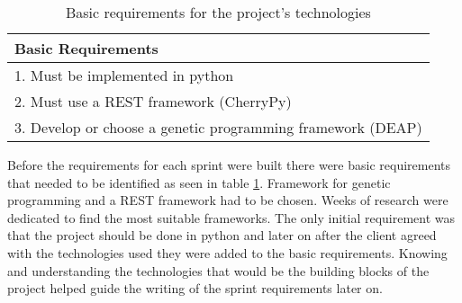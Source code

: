 \begin{table}[ht] 
\caption{Basic requirements for the project's technologies} %
\centering %
\begin{tabular}{l} %
\hline\hline %
Basic Requirements \\ [0.5ex] %
\hline %
1. Must be implemented in python \\
2. Must use a REST framework (CherryPy) \\
3. Develop or choose a genetic programming framework (DEAP) \\
\hline %
\end{tabular} 
\label{table:breq} %
\end{table}

Before the requirements for each sprint were built there were basic requirements that needed to be identified as seen in table \ref{table:breq}. 
Framework for genetic programming and a REST framework had to be chosen. Weeks of research were dedicated to find the most suitable frameworks.
The only initial requirement was that the project should be done in python and later on after the client agreed with the technologies used they
were  added to the basic requirements. Knowing and understanding the technologies that would be the building blocks of the project helped guide 
the writing of the sprint requirements later on.
